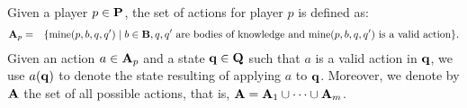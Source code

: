 %
%
%
%
%
%

Given a player $p \in \mathbf{P}$, the set of actions for player $p$ is defined as:
\begin{eqnarray*}
\mathbf{A}_p & = & \{ \text{\rm mine}(p,b,q,q') \mid b \in \mathbf{B}, q, q' \text{ are bodies of knowledge and }\text{\rm mine}(p,b,q,q') \text{ is a valid action}\}.
\end{eqnarray*}
 
Given an action $a \in \mathbf{A}_p$ and a state $\mathbf{q} \in \mathbf{Q}$ such that $a$ is a valid action in $\mathbf{q}$, we use $a(\mathbf{q})$ to denote the state resulting of applying $a$ to $\mathbf{q}$. Moreover, we denote by $\mathbf{A}$ the set of all possible actions, that is, $\mathbf{A} = \mathbf{A}_1 \cup \cdots \cup \mathbf{A}_m$.

